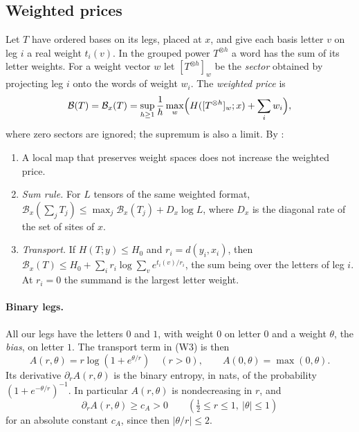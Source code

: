 \documentclass[11pt]{article}
\theoremstyle{remark}
\newcommand{\price}{\mathcal B}
\begin{document}
\subsection{Weighted prices}
Let \(T\) have ordered bases on its legs, placed at \(x\), and give each
basis letter \(v\) on leg \(i\) a real weight \(t_i(v)\). In the
grouped power \(T^{\otimes h}\) a word has the sum of its letter weights.
For a weight vector \(w\) let \([T^{\otimes h}]_w\) be the \emph{sector}
obtained by projecting leg \(i\) onto the words of weight \(w_i\). The
\emph{weighted price} \cite[Equation (11.1)]{hc} is
\begin{equation}\label{eq:weighted}
 \price(T)=\price_x(T)=\sup_{h\ge1}\frac1h\max_w
   \Bigl(H([T^{\otimes h}]_w;x)+\sum_iw_i\Bigr),
\end{equation}
where zero sectors are ignored; the supremum is also a limit. By
\cite[Lemma 11.1]{hc}:
\begin{enumerate}
\item[(W1)] A local map that preserves weight spaces does not increase
the weighted price.
\item[(W2)] \emph{Sum rule.} For \(L\) tensors of the same weighted format,
\(\price_x(\sum_jT_j)\le\max_j\price_x(T_j)+D_x\log L\), where \(D_x\) is
the diagonal rate of the set of sites of \(x\).
\item[(W3)] \emph{Transport.} If \(H(T;y)\le H_0\) and
\(r_i=d(y_i,x_i)\), then
\(\price_x(T)\le H_0+\sum_ir_i\log\sum_ve^{t_i(v)/r_i}\), the sum being
over the letters of leg \(i\). At \(r_i=0\) the summand is the largest
letter weight.
\end{enumerate}

\paragraph{Binary legs.}
All our legs have the letters \(0\) and \(1\), with weight \(0\) on
letter \(0\) and a weight \(\theta\), the \emph{bias}, on letter \(1\).
The transport term in (W3) is then
\[
 A(r,\theta)=r\log(1+e^{\theta/r})\quad(r>0),\qquad
 A(0,\theta)=\max(0,\theta).
\]
Its derivative \(\partial_rA(r,\theta)\) is the binary entropy, in nats,
of the probability \((1+e^{-\theta/r})^{-1}\). In particular
\(A(r,\theta)\) is nondecreasing in \(r\), and
\begin{equation}\label{eq:entropy-lb}
 \partial_rA(r,\theta)\ge c_A>0\qquad(\tfrac12\le r\le1,\ |\theta|\le1)
\end{equation}
for an absolute constant \(c_A\), since then \(|\theta/r|\le2\).
\end{document}
